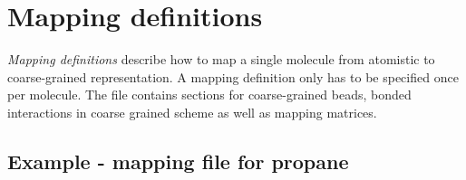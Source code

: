 \section{Mapping definitions}
{\em Mapping definitions} describe how to map a single molecule from atomistic to coarse-grained representation. A mapping definition only has to be specified once per molecule. The file contains sections for coarse-grained beads, bonded interactions in coarse grained scheme as well as mapping matrices. 

\subsection{Example - mapping file for propane}


